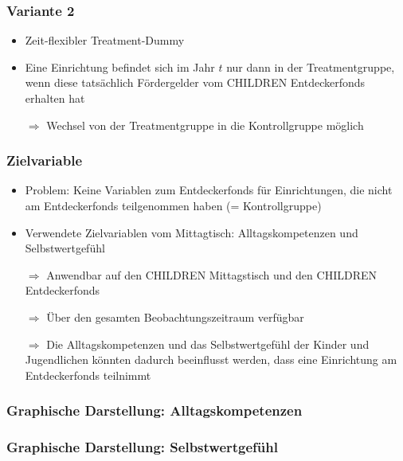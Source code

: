 \begin{frame}[fragile]
\frametitle{Variante 2}
\begin{itemize}
\item Zeit-flexibler Treatment-Dummy
\item Eine Einrichtung befindet sich im Jahr $t$ nur dann in der Treatmentgruppe, wenn diese tatsächlich Fördergelder vom CHILDREN Entdeckerfonds erhalten hat
\item [$\Rightarrow$] Wechsel von der Treatmentgruppe in die Kontrollgruppe möglich
\end{itemize}
\end{frame}

\begin{frame}[fragile]
\frametitle{Zielvariable}
\begin{itemize}
\item Problem: Keine Variablen zum Entdeckerfonds für Einrichtungen, die nicht am Entdeckerfonds teilgenommen haben (= Kontrollgruppe) 
\item Verwendete Zielvariablen vom Mittagtisch: Alltagskompetenzen und Selbstwertgefühl
\item [$\Rightarrow$] Anwendbar auf den CHILDREN Mittagstisch und den CHILDREN Entdeckerfonds 
\item [$\Rightarrow$] Über den gesamten Beobachtungszeitraum verfügbar
\item [$\Rightarrow$] Die Alltagskompetenzen und das Selbstwertgefühl der Kinder und Jugendlichen könnten dadurch beeinflusst werden, dass eine Einrichtung am Entdeckerfonds teilnimmt
\end{itemize}
\end{frame}

\begin{frame}[fragile]
\frametitle{Graphische Darstellung: Alltagskompetenzen}
\end{frame}

\begin{frame}[fragile]
\frametitle{Graphische Darstellung: Selbstwertgefühl}
\end{frame}

